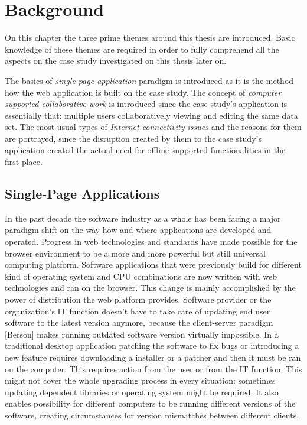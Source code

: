 \chapter{Background}

On this chapter the three prime themes around this thesis are introduced. Basic knowledge of these themes are required in order to fully comprehend all the aspects on the case study investigated on this thesis later on. 

The basics of \textit{single-page application} paradigm is introduced as it is the method how the web application is built on the case study. The concept of \textit{computer supported collaborative work} is introduced since the case study's application is essentially that: multiple users collaboratively viewing and editing the same data set. The most usual types of \textit{Internet connectivity issues} and the reasons for them are portrayed, since the disruption created by them to the case study's application created the actual need for offline supported functionalities in the first place. 




\section{Single-Page Applications}
\label{sec:spa}


In the past decade the software industry as a whole has been facing a major paradigm shift on the way how and where applications are developed and operated. Progress in web technologies and standards have made possible for the browser environment to be a more and more powerful but still universal computing platform. Software applications that were previously build for different kind of operating system and CPU combinations are now written with web technologies and ran on the browser. This change is mainly accomplished by the power of distribution the web platform provides. Software provider or the organization's IT function doesn't have to take care of updating end user software to the latest version anymore, because the client-server paradigm [Berson] makes running outdated software version virtually impossible. In a traditional desktop application patching the software to fix bugs or introducing a new feature requires downloading a installer or a patcher and then it must be ran on the computer. This requires action from the user or from the IT function. This might not cover the whole upgrading process in every situation: sometimes updating dependent libraries or operating system might be required. It also enables possibility for different computers to be running different versions of the software, creating circumstances for version mismatches between different clients. \cite{jazayeri_trends_????} \cite{taivalsaari_mashware:_2009} %

